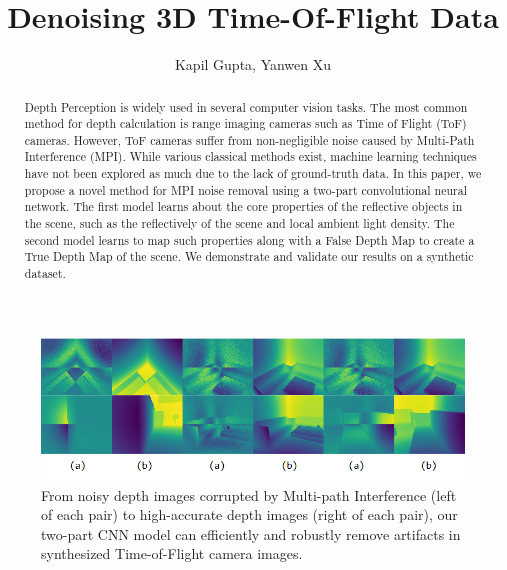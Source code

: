 \documentclass[runningheads]{llncs}
\begin{document}
\pagestyle{headings}
\mainmatter
\def\ECCV18SubNumber{***}  %

\title{Denoising 3D Time-Of-Flight Data} %

\titlerunning{ECCV-19 \ECCV18SubNumber}

\authorrunning{ECCV-19 \ECCV18SubNumber}

\author{Kapil Gupta, Yanwen Xu}


\maketitle

\begin{figure}
    \centering
    \includegraphics[scale=0.6]{img/depthmap/Figure_1.png}
    \caption{
    From noisy depth images corrupted by Multi-path Interference (left of each pair) to high-accurate depth images (right of each pair), our two-part CNN model can efficiently and robustly remove artifacts in synthesized Time-of-Flight camera images. }
    \label{fig:result_raw}
\end{figure}

\begin{abstract}
Depth Perception is widely used in several computer vision tasks.
The most common method for depth calculation is range imaging cameras such as Time of Flight (ToF) cameras.  
However, ToF cameras suffer from non-negligible noise caused by Multi-Path Interference (MPI). 
While various classical methods exist, machine learning techniques have not been explored as much due to the lack of ground-truth data. 
In this paper, we propose a novel method for MPI noise removal using a two-part convolutional neural network.  
The first model learns about the core properties of the reflective objects in the scene, such as the reflectively of the scene and local ambient light density.  
The second model learns to map such properties along with a False Depth Map to create a True Depth Map of the scene. 
We demonstrate and validate our results on a synthetic dataset.

\end{abstract}
\end{document}
